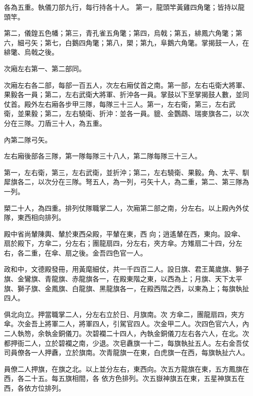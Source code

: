\begin{pinyinscope}
 各為五重。執儀刀部九行，每行持各十人。
 第一，龍頭竿黃雞四角氅；皆持以龍頭竿。



 第二，儀鍠五色幡；第三，青孔雀五角氅；第四，烏戟；第五，緋鳳六角氅；第六，細弓矢；第七，白鵝四角氅；第八，槊；第九，阜鵝六角氅。掌揭鼓一人，在緋氅、烏戟之後。



 次廂左右第一、第二部同。



 次廂左右各二部，每部一百五人，次左右廂仗首之南。第一部，左右屯衛大將軍、果毅各一員；第二，左右武衛大將軍、折沖各一員。掌鼓以下至掌揭鼓人數，並同仗首。殿外左右廂各步甲三隊，每隊三十三人。第一，左右衛，第三，左右武
 衛，並果毅；第二，左右驍衛、折沖：並各一員。貔、金鸚鵡、瑞麥旗各二，以次分在三隊。刀盾三十人，為五重。



 內第二隊弓矢。



 左右廂後部各三隊，第一隊每隊三十八人，第二隊每隊三十三人。



 第一，左右衛，第三，左右武衛，並折沖；第二，左右驍衛、果毅。角、太平、馴犀旗各二，以次分在三隊。弩五人，為一列，弓矢十人，為二重，第二、第三隊為一列。



 槊二十人，為四重。排列仗隊職掌二人，次廂第二部之南，分左右。以上殿內外仗隊，東西相向排列。



 殿中省尚輦陳輿、輦於東西朵殿，平輦在東，西
 向；逍遙輦在西，東向。設傘、扇於殿下，方傘二，分左右；團龍扇四，分左右，夾方傘。方雉扇二十四，分左右，各二重，在傘、扇之後。金吾四色官一人。



 政和中，文德殿發冊，用黃麾細仗，共一千四百二人。設日旗、君王萬歲旗、獅子旗、金鸞旗、青龍旗、赤龍旗各一，在殿東階之東，以西為上；月旗、天下太平旗、獅子旗、金鳳旗、白龍旗、黑龍旗各一，在殿西階之西，以東為上；每旗執扯四人。



 俱北向立。押當職掌二人，分左右立於日、月旗南。次
 方傘二，團龍扇四，夾方傘。次金吾上將軍二人，將軍四人，引駕官四人。次金甲二人。次四色官六人，內二人執笏，余執金銅儀刀。次碧襴二十四人，內執金銅儀刀左右各六人，在北。次都押衙二人，立於碧襴之南，少退。次皂纛旗一十二，每旗執扯五人。左右金吾仗司員僚各一人押纛，立於旗南。次青龍旗一在東，白虎旗一在西，每旗執扯六人。



 員僚二人押旗，在旗之北。以上並分左右，東西向。次五方龍旗在東，五方鳳旗在西，各二十五。每五旗相間，各
 依方色排列。次五嶽神旗五在東，五星神旗五在西，各依方位排列。




\end{pinyinscope}
